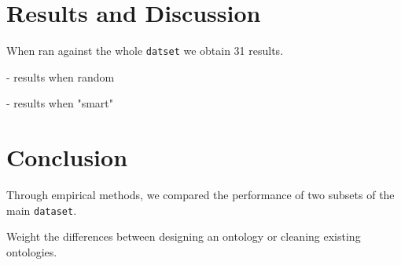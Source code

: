 \documentclass[runningheads,a4paper]{../../StyleFiles/llncs}
\begin{document}
\section{Results and Discussion}
When ran against the whole \texttt{datset} we obtain 31 results. 

- results when random 

- results when "smart"

\section{Conclusion}
Through empirical methods, we compared the performance of two subsets of the main \texttt{dataset}. 

Weight the differences between designing an ontology or cleaning existing ontologies.



\end{document}
